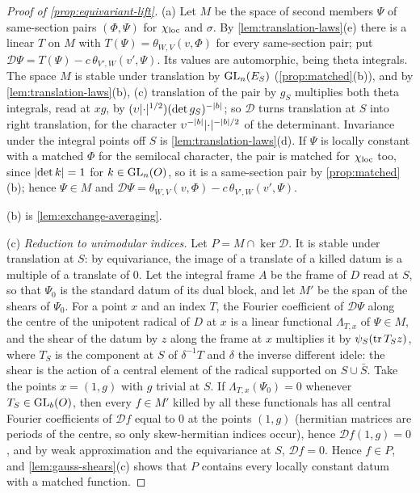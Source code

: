 \begin{proof}[Proof of \cref{prop:equivariant-lift}]
(a) Let $M$ be the space of second members $\Psi$ of same-section pairs $(\Phi,\Psi)$ for $\chi_{\rm loc}$ and $\sigma$. By \cref{lem:translation-laws}(e) there is a linear $T$ on $M$ with
$T(\Psi)=\theta_{W,V}(v,\Phi)$ for every same-section pair; put $\mathcal D\Psi=T(\Psi)-c\,\theta_{V',W}(v',\Psi)$. Its values are automorphic, being theta integrals. The space $M$ is stable under translation by
$\operatorname{GL}_n(E_S)$ (\cref{prop:matched}(b)), and by \cref{lem:translation-laws}(b), (c) translation of the pair by $g_S$ multiplies both theta integrals, read at $xg$, by $(\upsilon\lvert \cdot\rvert^{1/2})(\det g_S)^{-\lvert b\rvert}$;
so $\mathcal D$ turns translation at $S$ into right translation, for the character $\upsilon^{-\lvert b\rvert}\lvert \cdot\rvert^{-\lvert b\rvert/2}$ of the determinant. Invariance under the integral points off $S$ is
\cref{lem:translation-laws}(d). If $\Psi$ is locally constant with a matched $\Phi$ for the semilocal character, the pair is matched for $\chi_{\rm loc}$ too, since $\lvert \det k\rvert=1$ for $k\in\operatorname{GL}_n(O)$, so it is
a same-section pair by \cref{prop:matched}(b); hence $\Psi\in M$ and $\mathcal D\Psi=\theta_{W,V}(v,\Phi)-c\,\theta_{V',W}(v',\Psi)$.

(b) is \cref{lem:exchange-averaging}.

(c) \emph{Reduction to unimodular indices.} Let $P=M\cap\ker\mathcal D$. It is stable under translation at $S$: by equivariance, the image of a translate of a killed datum is a multiple of a translate of $0$. Let the
integral frame $A$ be the frame of $D$ read at $S$, so that $\Psi_0$ is the standard datum of its dual block, and let $M'$ be the span of the shears of $\Psi_0$. For a point $x$ and an index $T$, the Fourier
coefficient of $\mathcal D\Psi$ along the centre of the unipotent radical of $D$ at $x$ is a linear functional $\Lambda_{T,x}$ of $\Psi\in M$, and the shear of the datum by $z$ along the frame at $x$ multiplies it by
$\psi_S(\operatorname{tr} T_Sz)$, where $T_S$ is the component at $S$ of $\delta^{-1}T$ and $\delta$ the inverse different idele: the shear is the action of a central element of the radical supported on $S\cup\bar S$. Take
the points $x=(1,g)$ with $g$ trivial at $S$. If $\Lambda_{T,x}(\Psi_0)=0$ whenever $T_S\in\operatorname{GL}_b(O)$, then every $f\in M'$ killed by all these functionals has all central Fourier coefficients of $\mathcal Df$ equal to $0$
at the points $(1,g)$ (hermitian matrices are periods of the centre, so only skew-hermitian indices occur), hence $\mathcal Df(1,g)=0$, and by weak approximation and the equivariance at $S$, $\mathcal Df=0$. Hence
$f\in P$, and \cref{lem:gauss-shears}(c) shows that $P$ contains every locally constant datum with a matched function.


\end{proof}
